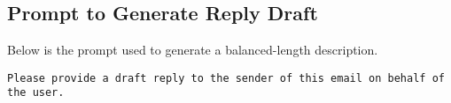 \subsection{Prompt to Generate Reply Draft}
Below is the prompt used to generate a balanced-length description.
\begin{lstlisting}
Please provide a draft reply to the sender of this email on behalf of the user.
\end{lstlisting}


